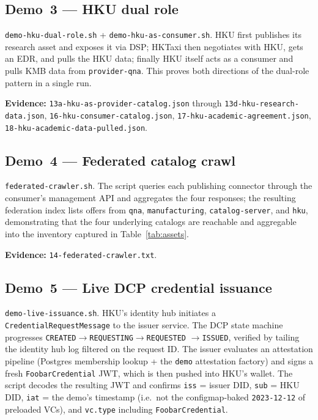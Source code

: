 \documentclass[11pt,a4paper]{article}
\DeclareRobustCommand{\code}[1]{\texttt{\small #1}}
\begin{document}
\subsection{Demo~3 --- HKU dual role}

\code{demo-hku-dual-role.sh} + \code{demo-hku-as-consumer.sh}. HKU first
publishes its research asset and exposes it via DSP; HKTaxi then
negotiates with HKU, gets an EDR, and pulls the HKU data; finally HKU
itself acts as a consumer and pulls KMB data from \code{provider-qna}.
This proves both directions of the dual-role pattern in a single run.

\noindent\textbf{Evidence:} \code{13a-hku-as-provider-catalog.json}
through \code{13d-hku-research-data.json},
\code{16-hku-consumer-catalog.json}, \code{17-hku-academic-agreement.json},
\code{18-hku-academic-data-pulled.json}.

\subsection{Demo~4 --- Federated catalog crawl}

\code{federated-crawler.sh}. The script queries each publishing
connector through the consumer's management API and aggregates the
four responses; the resulting federation index lists offers from
\code{qna}, \code{manufacturing}, \code{catalog-server}, and
\code{hku}, demonstrating that the four underlying catalogs are
reachable and aggregable into the inventory captured in
Table~\ref{tab:assets}.

\noindent\textbf{Evidence:} \code{14-federated-crawler.txt}.

\subsection{Demo~5 --- Live DCP credential issuance}
\label{sec:eval-d5}

\code{demo-live-issuance.sh}. HKU's identity hub initiates a
\code{CredentialRequestMessage} to the issuer service. The DCP state
machine progresses
\code{CREATED}$\rightarrow$\code{REQUESTING}$\rightarrow$\code{REQUESTED}%
$\rightarrow$\code{ISSUED}, verified by tailing the identity hub log
filtered on the request ID. The issuer evaluates an attestation
pipeline (Postgres membership lookup + the \code{demo} attestation
factory) and signs a fresh \code{FoobarCredential} JWT, which is then
pushed into HKU's wallet. The script decodes the resulting JWT and
confirms \code{iss} = issuer DID, \code{sub} = HKU DID, \code{iat} =
the demo's timestamp (i.e.\ not the configmap-baked \code{2023-12-12}
of preloaded VCs), and \code{vc.type} including
\code{FoobarCredential}.
\end{document}
